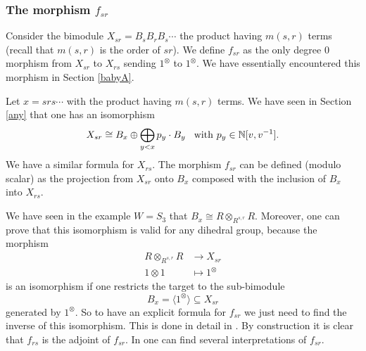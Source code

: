 \documentclass[12pt]{wart}
\theoremstyle{remark}
\begin{document}
 

\subsubsection{The morphism $f_{sr}$}

Consider the bimodule $X_{sr}=B_sB_rB_s\cdots$ the product having $m(s,r)$ terms (recall that $m(s,r)$ is the order of $sr$). 
We define $f_{sr}$ as the only  degree $0$ morphism from $X_{sr}$ to $  X_{rs}$ sending $1^{\otimes}$ to $1^{\otimes}$. We have essentially encountered this morphism in Section \ref{babyA}.

Let $x=srs\cdots$ with the product having $m(s,r)$ terms. 
We have seen in Section \ref{any} that one has an isomorphism $$ X_{sr}\cong B_x\oplus \bigoplus_{y<x}p_y\cdot  B_y\hspace{.3cm}\mathrm{with }\ p_y\in \mathbb N[v, v^{-1}]. $$
We have a similar formula for $X_{rs}$. The morphism $f_{sr}$ can be defined (modulo scalar) as the  projection from $X_{sr}$ onto $B_x$ composed with the inclusion of $B_x$ into $X_{rs}$.

 We have seen in the example $W=S_3$ that   $ B_{x}\cong R\otimes_{R^{s,r}}R.$ Moreover,  one can prove that this isomorphism is valid for any dihedral group, because the morphism
\begin{align*}
 R\otimes_{R^{s,r}}R&\rightarrow X_{sr}\\
1\otimes 1&\mapsto 1^{\otimes}
\end{align*}
is an isomorphism if one restricts the target to the sub-bimodule $$B_x=\langle 1^{\otimes}\rangle\subseteq X_{sr}$$ generated by $1^{\otimes}$. So to have an explicit formula for $f_{sr}$ we just need to find the inverse of this isomorphism. This is done in detail in \cite[Prop. 3.9]{li2.5}. By  construction it is clear that $f_{rs}$ is the adjoint of $f_{sr}.$ In \cite[Chapter 2]{Li0} one can find several interpretations of $f_{sr}$. 
\end{document}

